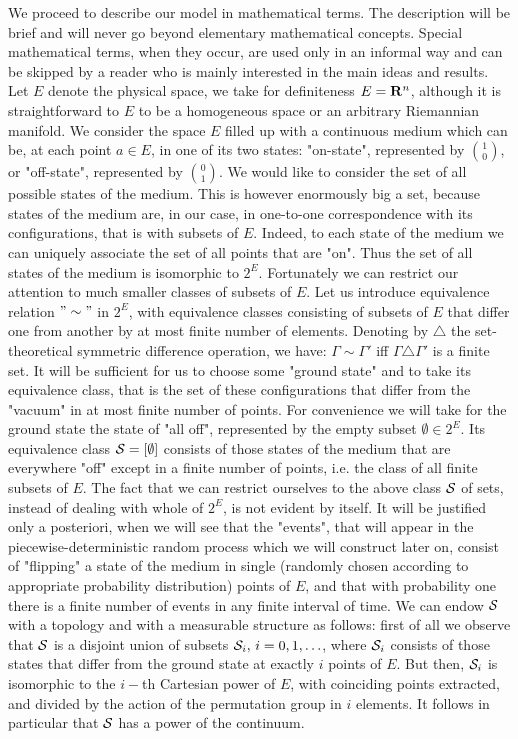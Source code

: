 \documentclass[12pt]{article}
\begin{document}
We proceed to describe our model in mathematical terms. The description
will be brief and will never go beyond elementary mathematical concepts.
Special mathematical terms, when they occur, are used only in an informal
way and can be skipped by a reader who is mainly interested in the main
ideas and results. Let $E$ denote the physical space, we take for
definiteness $E={\bf R}^n$, although it is straightforward to $E$ to be a
homogeneous space or an arbitrary Riemannian manifold. We consider the
space $E$ filled up with a continuous medium which can be, at each point
$a\in E$, in one of its two states: "on-state", represented by
${1\choose0}$, or "off-state", represented by ${0\choose1}$. We would like
to consider the set of all possible states of the medium. This is however
enormously big a set, because states of the medium are, in our case, in
one-to-one correspondence with its configurations, that is with subsets
of $E$. Indeed, to each state of the medium we can uniquely associate the
set of all points that are "on". Thus the set of all states of the medium
is isomorphic to $2^E$. Fortunately we can restrict our attention to much
smaller classes of subsets of $E$. Let us introduce equivalence relation
$"\sim "$ in $2^E$, with equivalence classes consisting of subsets of $E$
that differ one from another by at most finite number of elements. Denoting
by ${\scriptstyle\triangle}$ the set-theoretical symmetric difference
operation, we have: $\Gamma\sim \Gamma '$ iff
$\Gamma{\scriptstyle\triangle} \Gamma '$ is a finite set. It will be
sufficient for us to choose some "ground state" and to take its equivalence
class, that is the set of these configurations that differ from the
"vacuum" in at most finite number of points. For convenience we will take
for the ground state the state of "all off", represented by the empty
subset $\emptyset \in 2^E$. Its equivalence class ${\cal S} = [ \emptyset
]$ consists of those states of the medium that are everywhere "off" except
in a finite number of points, i.e. the class of all {\sl } finite subsets
of $E$.
\vskip10pt
The fact that we can restrict ourselves to the above class ${\cal S}$ of
sets, instead of dealing with whole of $2^E$, is not evident by itself. It
will be justified only a posteriori, when we will see that the "events",
that will appear in the piecewise-deterministic random process which we
will construct later on, consist of "flipping" a state of the medium in
single (randomly chosen according to appropriate probability distribution)
points of $E$, and that with probability one there is a finite number of
events in any finite interval of time.
\vskip10pt
We can endow ${\cal S}$ with a topology and with a measurable structure as
follows: first of all we observe that ${\cal S}$ is a disjoint union of
subsets ${\cal S}_i , \, i=0,1,\ldots $, where ${\cal S}_i$ consists of
those states that differ from the ground state at exactly $i$ points of
$E$. But then, ${\cal S}_i$ is isomorphic to the $i-$th Cartesian power of
$E$, with coinciding points extracted, and divided by the action of the
permutation group in $i$ elements. It follows in particular that ${\cal S}$
has a power of the continuum.
\end{document}
